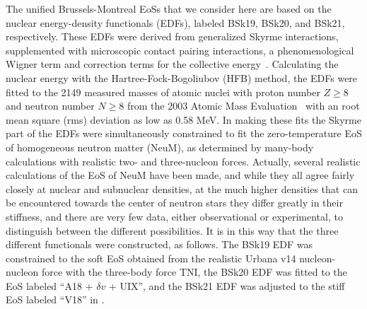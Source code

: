 \documentclass{aa}
\begin{document}
The unified Brussels-Montreal EoSs that we consider here are based on the 
nuclear energy-density functionals (EDFs), labeled BSk19,
BSk20, and 
BSk21, respectively. These EDFs were derived from generalized Skyrme 
interactions, supplemented with microscopic contact pairing interactions,
a phenomenological Wigner term and correction terms for the collective 
energy~\citep{Goriely-ea10,Chamel10}. Calculating the nuclear energy with
the Hartree-Fock-Bogoliubov (HFB) method, the EDFs were fitted to the 2149 
measured masses of atomic nuclei with proton number $Z\geq 8$ and neutron 
number $N\geq 8$ from the 2003 Atomic Mass Evaluation~\citep{audi2003} with an 
root mean square (rms) deviation as low as 0.58 MeV. In making these fits the Skyrme part of the
EDFs were simultaneously constrained to fit the zero-temperature EoS of 
homogeneous neutron matter (NeuM), as determined by many-body calculations with 
realistic two- and three-nucleon forces. Actually, several realistic 
calculations of the EoS of NeuM have been made, and while they all agree fairly
closely at nuclear and subnuclear densities, at the much higher densities that 
can be encountered towards the center of neutron stars they differ greatly in 
their stiffness, and there are very few data, either observational or 
experimental, to distinguish between the different possibilities. 
It is in 
this way that the three different functionals were
constructed, as follows. 
The BSk19 EDF was constrained to the soft \citet{FP81} EoS obtained from the 
realistic Urbana v14 nucleon-nucleon force with the three-body force TNI, the 
BSk20 EDF was fitted to the \citet{APR} EoS labeled ``A18 +
$\delta v$ + UIX'',
and the BSk21 EDF was adjusted to the stiff EoS labeled
``V18'' in 
\citet{LiSchulze}.
\end{document}
